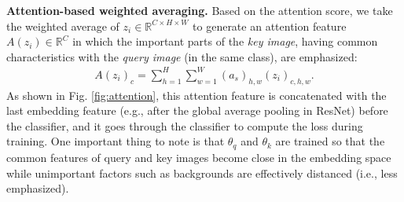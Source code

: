 \documentclass{article}
\theoremstyle{plain}
\theoremstyle{definition}
\theoremstyle{remark}
\begin{document}
\vspace{-3mm}




\textbf{Attention-based weighted averaging.} Based on the attention score, we take the weighted average of $z_i\in \mathbb{R}^{C\times H \times W}$ to generate an attention feature $A(z_i) \in \mathbb{R}^{C}$ in which the important parts of the \textit{key image},  having  common characteristics with the \textit{query image} (in the same class), are emphasized:
 \begin{align}
A(z_i)_c = \sum_{h=1}^H\sum_{w=1}^W (a_s)_{h,w} (z_i)_{c,h,w}.
\end{align} 
As shown in Fig. \ref{fig:attention},  this attention feature is concatenated with the last embedding feature (e.g., after the  global average pooling in ResNet) before the classifier, and it goes through the classifier to compute the loss during training. 
One important thing to note is that $\theta_q$ and $\theta_k$ are trained so that the common features of query and key images become close in the embedding space while unimportant factors   such as  backgrounds  are effectively distanced (i.e., less emphasized). 
\end{document}
